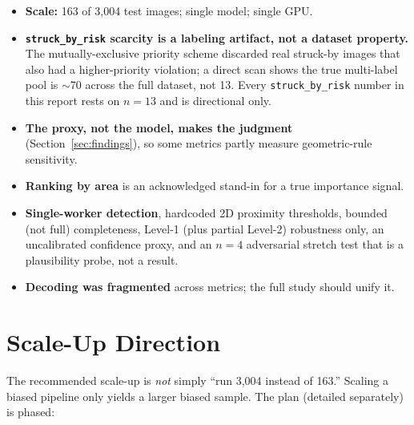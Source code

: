 \documentclass[11pt]{article}
\newcommand{\code}[1]{\texttt{\small #1}}
\begin{document}
\begin{itemize}[leftmargin=*,itemsep=2pt]
\item \textbf{Scale:} 163 of 3,004 test images; single model; single GPU.
\item \textbf{\code{struck\_by\_risk} scarcity is a labeling artifact, not a dataset property.} The
mutually-exclusive priority scheme discarded real struck-by images that also had a higher-priority
violation; a direct scan shows the true multi-label pool is $\sim$70 across the full dataset, not 13.
Every \code{struck\_by\_risk} number in this report rests on $n{=}13$ and is directional only.
\item \textbf{The proxy, not the model, makes the judgment} (Section~\ref{sec:findings}), so some metrics
partly measure geometric-rule sensitivity.
\item \textbf{Ranking by area} is an acknowledged stand-in for a true importance signal.
\item \textbf{Single-worker detection}, hardcoded 2D proximity thresholds, bounded (not full)
completeness, Level-1 (plus partial Level-2) robustness only, an uncalibrated confidence proxy, and an
$n{=}4$ adversarial stretch test that is a plausibility probe, not a result.
\item \textbf{Decoding was fragmented} across metrics; the full study should unify it.
\end{itemize}

\section{Scale-Up Direction}
\label{sec:scaleup}

The recommended scale-up is \emph{not} simply ``run 3,004 instead of 163.'' Scaling a biased pipeline
only yields a larger biased sample. The plan (detailed separately) is phased:
\end{document}
